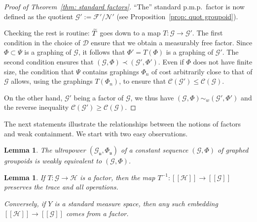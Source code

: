 \documentclass[10pt]{amsart}
\newtheorem{lemm}[cdrthm]{Lemma}
\theoremstyle{definition}
\newcommand{\cH}{\mathcal{H}}
\newcommand{\cost}{\mathcal{C}}
\newcommand{\cn}{\mathcal{N}}
\newcommand{\cg}{\mathcal{G}}
\newcommand{\cf}{\mathcal{F}}
\newcommand{\cd}{\mathcal{D}}
\newcommand{\ul}{\mathfrak{u}}
\newcommand{\pmp}{p.m.p.\ }
\let\oldtilde\tilde
\renewcommand*{\tilde}[1]{\mathchoice{\widetilde{#1}}{\widetilde{#1}}{\oldtilde{#1}}{\oldtilde{#1}}}
\begin{document}
\begin{proof}[Proof of Theorem~\ref{thm: standard factors}]
``The'' standard \pmp factor is now defined as the quotient $\cg':=\cf'/\cn'$ (see Proposition~\ref{prop: quot groupoid}).

Checking the rest is routine: $\tilde{T}$ goes down to a map $T:\cg\to \cg'$. The first condition in the choice of $\cd$ ensure that we obtain a measurably free factor. Since $\Phi\subset \Psi$ is a graphing of $\cg$, it follows that $\Phi'=T(\Phi)$ is a graphing of $\cg'$. The second condition ensures that $(\cg, \Phi)\prec (\cg',\Phi')$. Even if $\Phi$ does not have finite size, the condition that $\Psi$ contains graphings $\Phi_n$ of cost arbitrarily close to that of $\cg$ allows, using the graphings $T(\Phi_n)$, to ensure that $\cost(\cg')\leq \cost(\cg)$.

On the other hand, $\cg'$ being a factor of $\cg$, we thus have $(\cg, \Phi)\sim_{w} (\cg',\Phi')$ and the reverse inequality $\cost(\cg')\geq \cost(\cg)$.
\end{proof}

The next statements illustrate the relationships between the notions of factors and weak containment. We start with two easy observations.

\begin{lemm}\label{lem:ultrapower_weakly_equiv}
The ultrapower $(\cg_\ul,\Phi_\ul)$ of a constant sequence $(\cg, \Phi)$ of graphed groupoids is weakly equivalent to $(\cg,\Phi)$.
\end{lemm}

\begin{lemm}\label{Lem: factors vs full pseudogroups}
If $T\colon \cg \to \cH$ is a factor, then the map $T^{-1}\colon [[\cH]] \to [[\cg]]$ preserves the trace and all operations.

Conversely, if $Y$ is a standard measure space, then any such embedding $[[\cH]] \to [[\cg]]$ comes from a factor.
\end{lemm}
\end{document}
